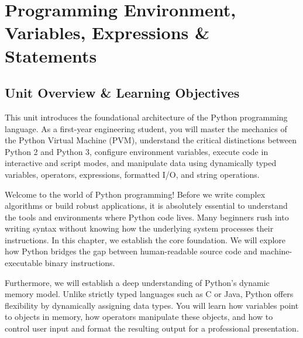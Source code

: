 \chapter{Programming Environment, Variables, Expressions \& Statements}
\label{chap:environment-variables-statements}

\section{Unit Overview \& Learning Objectives}

\begin{conceptbox}
This unit introduces the foundational architecture of the Python programming language. As a first-year engineering student, you will master the mechanics of the Python Virtual Machine (PVM), understand the critical distinctions between Python 2 and Python 3, configure environment variables, execute code in interactive and script modes, and manipulate data using dynamically typed variables, operators, expressions, formatted I/O, and string operations.
\end{conceptbox}

Welcome to the world of Python programming! Before we write complex algorithms or build robust applications, it is absolutely essential to understand the tools and environments where Python code lives. Many beginners rush into writing syntax without knowing how the underlying system processes their instructions. In this chapter, we establish the core foundation. We will explore how Python bridges the gap between human-readable source code and machine-executable binary instructions.

Furthermore, we will establish a deep understanding of Python's dynamic memory model. Unlike strictly typed languages such as C or Java, Python offers flexibility by dynamically assigning data types. You will learn how variables point to objects in memory, how operators manipulate these objects, and how to control user input and format the resulting output for a professional presentation.


